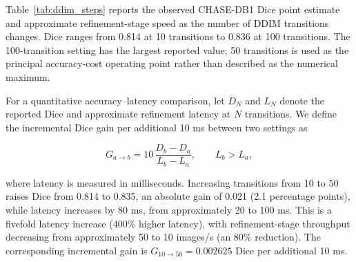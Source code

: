 \documentclass[jimaging,article,submit,pdftex,moreauthors]{Definitions/mdpi}%
\begin{document}
Table~\ref{tab:ddim_steps} reports the observed CHASE-DB1 Dice point estimate and approximate refinement-stage speed as the number of DDIM transitions changes. Dice ranges from 0.814 at 10 transitions to 0.836 at 100 transitions. The 100-transition setting has the largest reported value; 50 transitions is used as the principal accuracy-cost operating point rather than described as the numerical maximum.



\begin{table}[htbp]
\centering
\caption{Exploratory DDIM transition-count results on CHASE-DB1. Runtime includes mask encoding, refinement of the encoded multi-channel grid, and decoding but excludes LU-Net+RA coarse-mask generation. Measurements used batch size 1 on an NVIDIA GeForce RTX 4070 Ti SUPER.}
\label{tab:ddim_steps}
\small
{}
\end{table}



For a quantitative accuracy--latency comparison, let $D_N$ and $L_N$ denote the reported Dice and approximate refinement latency at $N$ transitions. We define the incremental Dice gain per additional 10 ms between two settings as

\begin{equation}
G_{a\rightarrow b}=10\,\frac{D_b-D_a}{L_b-L_a},\qquad L_b>L_a,
\end{equation}

where latency is measured in milliseconds. Increasing transitions from 10 to 50 raises Dice from 0.814 to 0.835, an absolute gain of 0.021 (2.1 percentage points), while latency increases by 80 ms, from approximately 20 to 100 ms. This is a fivefold latency increase (400\% higher latency), with refinement-stage throughput decreasing from approximately 50 to 10 images/s (an 80\% reduction). The corresponding incremental gain is $G_{10\rightarrow50}=0.002625$ Dice per additional 10 ms.
\end{document}
